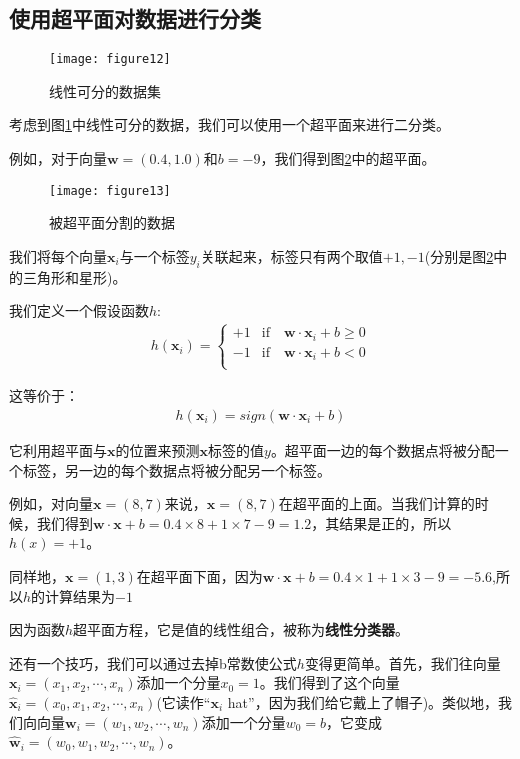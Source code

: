 \subsection{使用超平面对数据进行分类}


\begin{figure}[ht]
    \centering
    \texttt{[image: figure12]}
    \caption{线性可分的数据集}
    \label{figure12}
\end{figure}

考虑到图\ref{figure12}中线性可分的数据，我们可以使用一个超平面来进行二分类。

例如，对于向量$\mathbf{w}=(0.4,1.0)$和$b=-9$，我们得到图\ref{figure13}中的超平面。

\begin{figure}[ht]
    \centering
    \texttt{[image: figure13]}
    \caption{被超平面分割的数据}
    \label{figure13}
\end{figure}

我们将每个向量$\mathbf{x}_i$与一个标签$y_i$关联起来，标签只有两个取值$+1,-1$(分别是图\ref{figure13}中的三角形和星形)。

我们定义一个假设函数$h$:
\begin{gather*}
h(\mathbf{x}_i) = 
\begin{cases}
+1 & \text{if} \quad \mathbf{w}\cdot\mathbf{x}_i+b \geq 0 \\
-1 & \text{if} \quad \mathbf{w}\cdot\mathbf{x}_i+b < 0 \\
\end{cases}
\end{gather*}

这等价于：
\begin{gather*}
h(\mathbf{x}_i) = sign(\mathbf{w}\cdot\mathbf{x}_i+b)
\end{gather*}

它利用超平面与$\mathbf{x}$的位置来预测$\mathbf{x}$标签的值$y$。超平面一边的每个数据点将被分配一个标签，另一边的每个数据点将被分配另一个标签。

例如，对向量$\mathbf{x}=(8,7)$来说，$\mathbf{x}=(8,7)$在超平面的上面。当我们计算的时候，我们得到$\mathbf{w}\cdot\mathbf{x}+b = 0.4\times 8+1\times 7 -9=1.2$，其结果是正的，所以$h(x)=+1$。

同样地，$\mathbf{x}=(1,3)$在超平面下面，因为$\mathbf{w}\cdot\mathbf{x}+b = 0.4\times 1+1\times 3 -9=-5.6$,所以$h$的计算结果为$-1$

因为函数$h$超平面方程，它是值的线性组合，被称为\textbf{线性分类器}。

还有一个技巧，我们可以通过去掉b常数使公式$h$变得更简单。首先，我们往向量$\mathbf{x}_i=(x_1,x_2,\cdots,x_n)$添加一个分量$x_0=1$。我们得到了这个向量$\mathbf{\hat{x}}_i=(x_0,x_1,x_2,\cdots,x_n)$(它读作“$\mathbf{x}_i$ hat”，因为我们给它戴上了帽子)。类似地，我们向向量$\mathbf{w}_i=(w_1,w_2,\cdots,w_n)$添加一个分量$w_0=b$，它变成$\mathbf{\hat{w}}_i=(w_0,w_1,w_2,\cdots,w_n)$。

